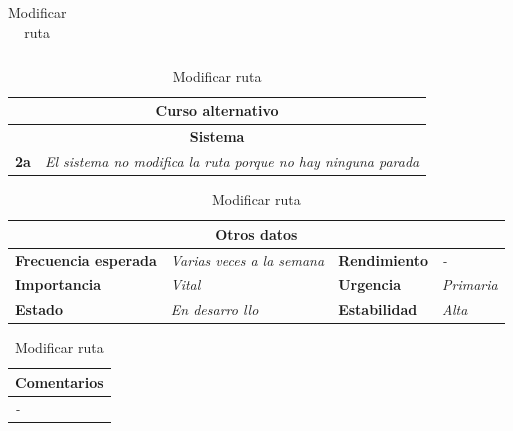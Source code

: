 \documentclass[12pt,spanish]{article}
\begin{document}
\begin{table}[H]
\begin{tabular}{|m{5pt}|m{7.33cm}|m{5pt}|m{7.33cm}|}
		
	\end{tabular}
	
	\vspace{0.5cm}
	
	\begin{tabular}{|m{12pt}|m{15.5cm}|}
		\hline
		\multicolumn{2}{|c|}{\textbf{Curso alternativo}} \\
		\hline
		\multicolumn{2}{|c|}{\textbf{Sistema}} \\
		\hline
		\textbf{2a} & \textit{El sistema no modifica la ruta porque no hay ninguna parada} \\
		\hline
	
		
	\end{tabular}
	
	\vspace{0.5cm}
	
	\begin{tabular}{|m{3.75cm}|m{3.75cm}|m{3.75cm}|m{3.8cm}|}
		\hline
		\multicolumn{4}{|c|}{\textbf{Otros datos}} \\
		\hline
		\textbf{Frecuencia esperada} & \textit{Varias veces a la semana} & \textbf{Rendimiento} & \textit{-} \\
		\hline
		\textbf{Importancia} & \textit{Vital} & \textbf{Urgencia} & \textit{Primaria} \\
		\hline
		\textbf{Estado} & \textit{En desarro
		llo} & \textbf{Estabilidad} & \textit{Alta} \\
		\hline
	\end{tabular}
	
	\vspace{1cm}
	
	\begin{tabular}{|m{16.2cm}|}
		\hline
		\textbf{Comentarios} \\
		\hline
		\textit{-} \\
		\hline
	\end{tabular}
	
	\caption{Modificar ruta}
	
\end{table}
\end{document}
